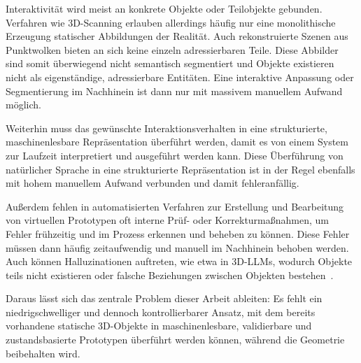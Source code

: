 Interaktivität wird meist an konkrete Objekte oder Teilobjekte gebunden. Verfahren wie 3D-Scanning erlauben allerdings häufig nur eine monolithische Erzeugung statischer Abbildungen der Realität. Auch rekonstruierte Szenen aus Punktwolken bieten an sich keine einzeln adressierbaren Teile. Diese Abbilder sind somit überwiegend nicht semantisch segmentiert und Objekte existieren nicht als eigenständige, adressierbare Entitäten. Eine interaktive Anpassung oder Segmentierung im Nachhinein ist dann nur mit massivem manuellem Aufwand möglich.

Weiterhin muss das gewünschte Interaktionsverhalten in eine strukturierte, maschinenlesbare Repräsentation überführt werden, damit es von einem System zur Laufzeit interpretiert und ausgeführt werden kann. Diese Überführung von natürlicher Sprache in eine strukturierte Repräsentation ist in der Regel ebenfalls mit hohem manuellem Aufwand verbunden und damit fehleranfällig.

Außerdem fehlen in automatisierten Verfahren zur Erstellung und Bearbeitung von virtuellen Prototypen oft interne Prüf- oder Korrekturmaßnahmen, um Fehler frühzeitig und im Prozess erkennen und beheben zu können. Diese Fehler müssen dann häufig zeitaufwendig und manuell im Nachhinein behoben werden. Auch können Halluzinationen auftreten, wie etwa in 3D-LLMs, wodurch Objekte teils nicht existieren oder falsche Beziehungen zwischen Objekten bestehen~\cite{pengUnderstandingEvaluatingHallucinations2025}.

Daraus lässt sich das zentrale Problem dieser Arbeit ableiten: Es fehlt ein niedrigschwelliger und dennoch kontrollierbarer Ansatz, mit dem bereits vorhandene statische 3D-Objekte in maschinenlesbare, validierbare und zustandsbasierte Prototypen überführt werden können, während die Geometrie beibehalten wird.




